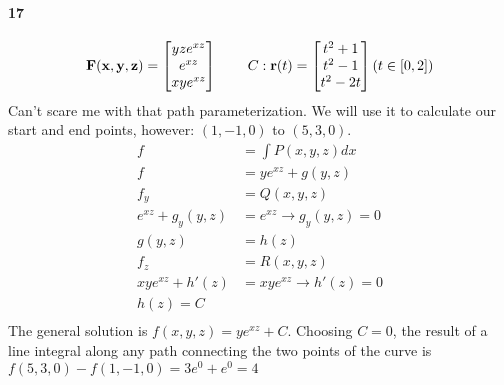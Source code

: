 \documentclass{article}
\begin{document}
    \paragraph{17}
    \[
        \mathbf{F(x,y,z)} = \begin{bmatrix} yze^{xz} \\ e^{xz} \\ xye^{xz} \end{bmatrix}
        \hspace{0.3in}
        C: \mathbf{r}(t) = \begin{bmatrix} t^2 + 1\\ t^2-1 \\ t^2-2t \end{bmatrix} (t \in [0,2])
    \]
    Can't scare me with that path parameterization.
    We will use it to calculate our start and end points, however: $(1,-1,0)$ to $(5,3,0)$.
    \begin{align*}
        f &= \int P(x,y,z) dx \\
        f &= ye^{xz} + g(y,z)\\
        f_y &= Q(x,y,z) \\
        e^{xz} + g_y(y,z) &= e^{xz} \rightarrow g_y(y,z) = 0 \\
        g(y,z) &= h(z) \\
        f_z &= R(x,y,z) \\
        xye^{xz} + h'(z) &= xye^{xz} \rightarrow h'(z) = 0 \\
        h(z) = C \\
    \end{align*}
    The general solution is $f(x,y,z) = ye^{xz}+C$. Choosing $C=0$, the result of a line integral along any path connecting
    the two points of the curve is $f(5,3,0)-f(1,-1,0)=3e^0 +e^0 = 4$
    
\end{document}
